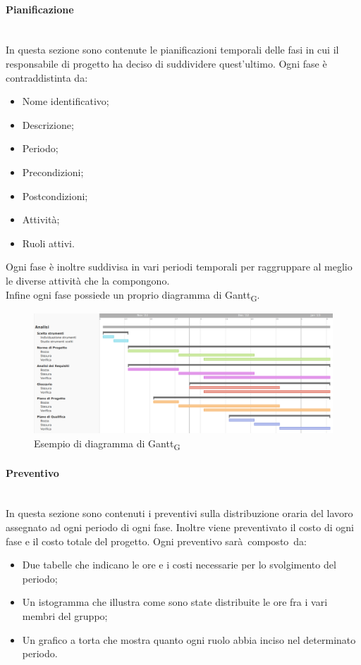\paragraph {Pianificazione}\mbox{}\\
In questa sezione sono contenute le pianificazioni temporali delle fasi in cui il responsabile di progetto ha deciso di suddividere quest'ultimo.
Ogni fase è contraddistinta da:
\begin{itemize}
	\item Nome identificativo;
	\item Descrizione;
	\item Periodo;
	\item Precondizioni;
	\item Postcondizioni;
	\item Attività;
	\item Ruoli attivi.
\end{itemize}
Ogni fase è inoltre suddivisa in vari periodi temporali per raggruppare al meglio le diverse attività che la compongono.\\
Infine ogni fase possiede un proprio diagramma di Gantt\textsubscript{G}.
\begin{figure}[h!]
	\centering
	\includegraphics[width=15cm]{img/4_analisi.png}
	\caption{Esempio di diagramma di Gantt\textsubscript{G}}
\end{figure}
\paragraph {Preventivo}\mbox{}\\
In questa sezione sono contenuti i preventivi sulla distribuzione oraria del lavoro assegnato ad ogni periodo di ogni fase. Inoltre viene preventivato il costo di ogni fase e il costo totale del progetto. Ogni preventivo sarà composto da:
\begin{itemize}
	\item Due tabelle che indicano le ore e i costi necessarie per lo svolgimento del periodo;
	\item Un istogramma che illustra come sono state distribuite le ore fra i vari membri del gruppo;
	\item Un grafico a torta che mostra quanto ogni ruolo abbia inciso nel determinato periodo.
\end{itemize}
